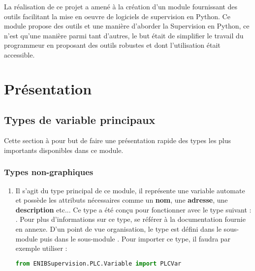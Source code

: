 {La réalisation de ce projet a amené à la création d'un module  fournissant des outils facilitant la mise en oeuvre de logiciels de supervision en Python.\newline
Ce module propose des outils et une manière d'aborder la Supervision en Python, ce n'est qu'une manière parmi tant d'autres, le but était de simplifier le travail du programmeur en proposant des outils robustes et dont l'utilisation était accessible.


\chapter{Présentation}

\section{Types de variable principaux}

Cette section à pour but de faire une présentation rapide des types les plus importants disponibles dans ce module.

\subsection{Types non-graphiques}

\begin{enumerate}

\item \label{tag-presentation-PLCVar}  \newline
Il s'agit du type principal de ce module, il représente une variable automate et possède les attributs nécessaires comme un \textbf{nom}, une \textbf{adresse}, une \textbf{description} etc... Ce type a été conçu pour fonctionner avec le type suivant : .\newline
Pour plus d'informations sur ce type, se référer à la documentation fournie en annexe.\newline
D'un point de vue organisation, le type  est défini dans le sous-module  puis dans le sous-module . \newline
Pour importer ce type, il faudra par exemple utiliser :
\begin{lstlisting}[language=Python]
from ENIBSupervision.PLC.Variable import PLCVar
\end{lstlisting}


\end{enumerate}}
